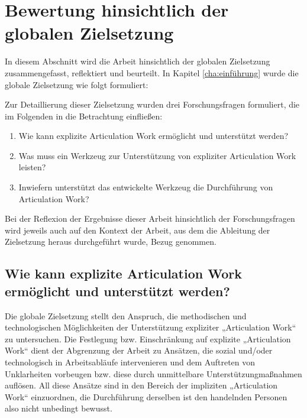 \section{Bewertung hinsichtlich der globalen Zielsetzung}
\label{sec:bewertung_hinsichtlich_der_globalen_zielsetzung}

In diesem Abschnitt wird die Arbeit hinsichtlich der globalen Zielsetzung zusammengefasst, reflektiert und beurteilt. In Kapitel \ref{cha:einführung} wurde die globale Zielsetzung wie folgt formuliert:


Zur Detaillierung dieser Zielsetzung wurden drei Forschungsfragen formuliert, die im Folgenden in die Betrachtung einfließen:
\begin{enumerate}
	\item Wie kann explizite Articulation Work ermöglicht und unterstützt werden?
	\item Was muss ein Werkzeug zur Unterstützung von expliziter Articulation Work leisten?
	\item Inwiefern unterstützt das entwickelte Werkzeug die Durchführung von Articulation Work?
\end{enumerate}

Bei der Reflexion der Ergebnisse dieser Arbeit hinsichtlich der Forschungsfragen wird jeweils auch auf den Kontext der Arbeit, aus dem die Ableitung der Zielsetzung heraus durchgeführt wurde, Bezug genommen.

\subsection{Wie kann explizite Articulation Work ermöglicht und unterstützt werden?}

Die globale Zielsetzung stellt den Anspruch, die methodischen und technologischen Möglichkeiten der Unterstützung expliziter „Articulation Work“ zu untersuchen. Die Festlegung bzw. Einschränkung auf explizite „Articulation Work“ dient der Abgrenzung der Arbeit zu Ansätzen, die sozial und/oder technologisch in Arbeitsabläufe intervenieren und dem Auftreten von Unklarheiten vorbeugen bzw. diese durch unmittelbare Unterstützungmaßnahmen auflösen. All diese Ansätze sind in den Bereich der impliziten „Articulation Work“ einzuordnen, die Durchführung derselben ist den handelnden Personen also nicht unbedingt bewusst. 

